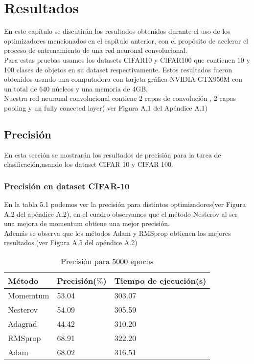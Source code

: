 \chapter{Resultados}
En este capítulo se discutirán los resultados obtenidos durante el uso de los optimizadores mencionados en el capítulo anterior, con el propósito de acelerar el proceso de entrenamiento de una red neuronal convolucional.\\ Para estas pruebas usamos los datasets CIFAR10 y CIFAR100 que contienen 10 y 100 clases de objetos en su dataset respectivamente. Estos resultados fueron obtenidos usando una computadora con tarjeta gráfica NVIDIA  GTX950M con un total de 640 núcleos y una memoria de 4GB.\\
Nuestra red neuronal convolucional contiene 2 capas de convolución , 2 capas pooling y un fully conected layer( ver Figura A.1 del Apéndice A.1)


\section{Precisión}
En esta sección se mostrarán los resultados de precisión para la tarea de clasificación,usando los dataset CIFAR 10 y CIFAR 100.
\subsection{Precisión en dataset CIFAR-10}
 En la tabla 5.1 podemos ver la precisión para distintos optimizadores(ver Figura A.2 del apéndice A.2), en el cuadro observamos que el método Nesterov al ser una mejora de momentum obtiene una mejor precisión.\\Además se observa que los métodos Adam y RMSprop obtienen los mejores resultados.(ver Figura A.5 del apéndice A.2)
\begin{table}[H]
	\centering
	\caption{Precisión para 5000 epochs}
	\label{my-label}
	\begin{centering}
	\begin{tabular}{@{}lll@{}}
		\toprule
		Método& Precisión($\%$)&  Tiempo de ejecución(s)  \\ \midrule
		Momemtum& 53.04  & 303.07 \\
		Nesterov& 54.09  &  305.59\\
		Adagrad& 44.42 &  310.20 \\
		RMSprop& 68.91 & 322.20 \\
		Adam& 68.02  & 316.51 \\ \bottomrule
	\end{tabular}
	\end{centering}

\end{table}

